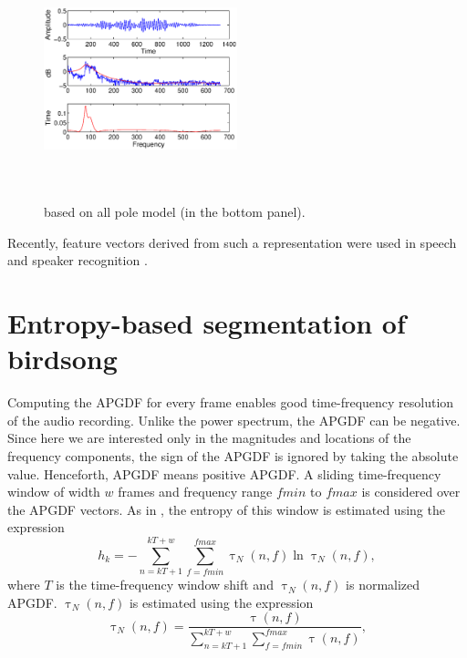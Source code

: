 \documentclass[a4paper]{article}
\begin{document}
\begin{figure}[h]
\centering
\includegraphics[width=0.5\textwidth,height=7cm]
{apgd.eps}
\caption{based on all pole model (in the bottom panel).}
\label{fig:all-pole}
\end{figure}


Recently, feature vectors
derived from such a representation were used in speech \cite{drugman} and speaker
recognition \cite{padman}. 









\section{Entropy-based segmentation of birdsong}

Computing the APGDF for every frame enables good time-frequency resolution of  the audio recording. Unlike the power spectrum, the APGDF can be negative. 
Since here we are interested only in the magnitudes and
locations of the frequency components, the sign of the APGDF is
ignored by taking the absolute value. Henceforth, APGDF means positive APGDF. 
 A sliding time-frequency window of width $w$ frames and frequency range
$fmin$ to $fmax$ is considered over the APGDF vectors. As in \cite{wang2013},
the entropy of this window is estimated using the expression
\begin{equation}
h_{k}=-\sum_{n=kT+1}^{kT+w}\sum_{f=fmin}^{fmax} \uptau_N(n,f) \ln \uptau_N(n,f),
\end{equation}
where $T$ is the time-frequency window shift and $\uptau_N(n,f)$ is normalized APGDF. $\uptau_N(n,f)$ is estimated using the expression \cite{wang2013}
\begin{equation}
\uptau_N(n,f)=\frac {\uptau(n,f)}
{\sum_{n=kT+1}^{kT+w}\sum_{f=fmin}^{fmax} \uptau(n,f)},
\end{equation}
\end{document}
